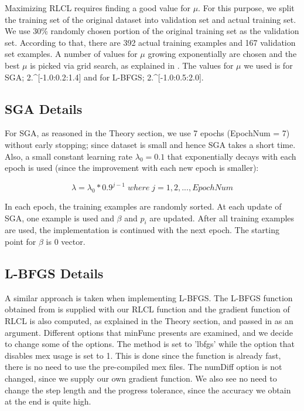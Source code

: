 \documentclass[a4paper]{article}
\begin{document}
Maximizing RLCL requires finding a good value for $\mu$. For this purpose, we split the training set of the original dataset into validation set and actual training set. We use 30\% randomly chosen portion of the original training set as the validation set. According to that, there are 392 actual training examples and 167 validation set examples. A number of values for $\mu$ growing exponentially are chosen and the best $\mu$ is picked via grid search, as explained in \cite{Label4}. The values for $\mu$ we used is for SGA; 2.\^{}{[}-1.0:0.2:1.4{]} and for L-BFGS; 2.\^{}{[}-1.0:0.5:2.0{]}.

\subsection{SGA Details}

For SGA, as reasoned in the Theory section, we use 7 epochs (EpochNum = 7) without early stopping; since dataset is small and hence SGA takes a short time. Also, a small constant learning rate $\lambda_0 = 0.1$ that exponentially decays with each epoch is used (since the improvement with each new epoch is smaller):

$$ \lambda = \lambda_0 * 0.9^{j-1} \; where \; j = 1, 2,..., EpochNum$$

In each epoch, the training examples are randomly sorted. At each update of SGA, one example is used and $\beta$ and $p_i$ are updated. After all training examples are used, the implementation is continued with the next epoch. The starting point for $\beta$ is 0 vector.

\subsection{L-BFGS Details}

A similar approach is taken when implementing L-BFGS. The L-BFGS function obtained from \cite{Label3} is supplied with our RLCL function and the gradient function of RLCL is also computed, as explained in the Theory section, and passed in as an argument. Different options that minFunc presents are examined, and we decide to change some of the options. The method is set to 'lbfgs' while the option that disables mex usage is set to 1. This is done since the function is already fast, there is no need to use the pre-compiled mex files. The numDiff option is not changed, since we supply our own gradient function. We also see no need to change the step length and the progress tolerance, since the accuracy we obtain at the end is quite high.\\
\end{document}
